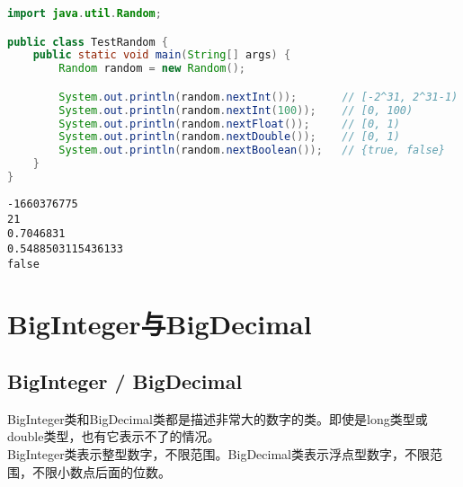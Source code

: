 \begin{lstlisting}[language=Java]
import java.util.Random;

public class TestRandom {
    public static void main(String[] args) {
        Random random = new Random();

        System.out.println(random.nextInt());       // [-2^31, 2^31-1)
        System.out.println(random.nextInt(100));    // [0, 100)
        System.out.println(random.nextFloat());     // [0, 1)
        System.out.println(random.nextDouble());    // [0, 1)
        System.out.println(random.nextBoolean());   // {true, false}
    }
}
\end{lstlisting}

\begin{tcolorbox}
	\begin{verbatim}
-1660376775
21
0.7046831
0.5488503115436133
false
	\end{verbatim}
\end{tcolorbox}

\newpage

\section{BigInteger与BigDecimal}

\subsection{BigInteger / BigDecimal}

BigInteger类和BigDecimal类都是描述非常大的数字的类。即使是long类型或double类型，也有它表示不了的情况。\\

BigInteger类表示整型数字，不限范围。BigDecimal类表示浮点型数字，不限范围，不限小数点后面的位数。

